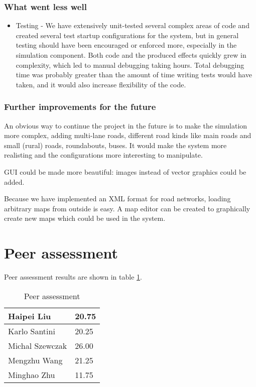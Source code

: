 \documentclass[a4paper,12pt]{article}
\begin{document}
\subsubsection*{What went less well}
\begin{itemize}
	\item Testing - We have extensively unit-tested several complex areas of code and created several test startup configurations for the system, but in general testing should have been encouraged or enforced more, especially in the simulation component. Both code and the produced effects quickly grew in complexity, which led to manual debugging taking hours. Total debugging time was probably greater than the amount of time writing tests would have taken, and it would also increase flexibility of the code.
\end{itemize}

\subsubsection*{Further improvements for the future}

An obvious way to continue the project in the future is to make the simulation more complex, adding multi-lane roads, different road kinds like main roads and small (rural) roads, roundabouts, buses. It would make the system more realisting and the configurations more interesting to manipulate.

GUI could be made more beautiful: images instead of vector graphics could be added.

Because we have implemented an XML format for road networks, loading arbitrary maps from outside is easy. A map editor can be created to graphically create new maps which could be used in the system.

\section{Peer assessment}

Peer assessment results are shown in table \ref{table:assessment}.

\begin{table}[!htb]
\centering
\caption{Peer assessment}
\label{table:assessment}
\begin{tabular}{|l|l|}
\hline
Haipei Liu      & 20.75 \\ \hline
Karlo Santini   & 20.25 \\ \hline
Michal Szewczak & 26.00 \\ \hline
Mengzhu Wang    & 21.25 \\ \hline
Minghao Zhu     & 11.75 \\ \hline
\end{tabular}
\end{table}
\end{document}
